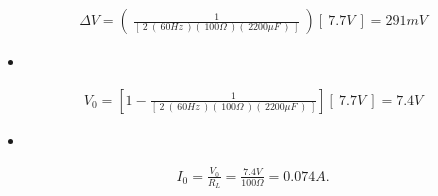 \begin{ceqn}
\begin{align}
\Delta V = (\ \frac{1}{[\ 2\ (\ 60Hz\ )(\ 100\Omega\ )(\ 2200\mu F\ )\ ]}\ )[\ 7.7 V\ ] = 291 mV
\end{align}
\end{ceqn}

\begin{itemize}
\item {\bfseries\itshape{}} \hfill \break
{\bfseries\itshape{}}
\end{itemize}

\begin{ceqn}
\begin{align}
V_{0} = [ 1 - \frac{1}{[\ 2\ (\ 60Hz\ )(\ 100\Omega\ )(\ 2200\mu F\ )\ ] }][\ 7.7 V\ ] = 7.4 V
\end{align}
\end{ceqn}

\begin{itemize}
\item {\bfseries\itshape{}} \hfill \break
{\bfseries\itshape{}}
\end{itemize}

\begin{ceqn}
\begin{align}
I_{0} = \frac{V_{0}}{R_{L}} = \frac{7.4V}{100\Omega} = 0.074 A.
\end{align}
\end{ceqn}

\pagebreak